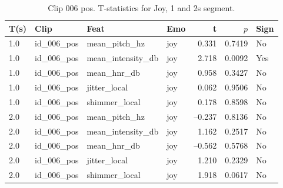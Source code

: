 \begin{table}[h]
  \centering
  \begin{tabular}{l l l l r r l}
    \toprule
    T(s) & Clip           & Feat            & Emo & t & $p$ & Sign \\
    \midrule
    1.0  & id\_006\_pos   & mean\_pitch\_hz       & joy     & 0.331        & 0.7419 & No \\
    1.0  & id\_006\_pos   & mean\_intensity\_db   & joy     & 2.718        & 0.0092 & Yes \\
    1.0  & id\_006\_pos   & mean\_hnr\_db         & joy     & 0.958        & 0.3427 & No \\
    1.0  & id\_006\_pos   & jitter\_local         & joy     & 0.062        & 0.9506 & No \\
    1.0  & id\_006\_pos   & shimmer\_local        & joy     & 0.178        & 0.8598 & No \\
    2.0  & id\_006\_pos   & mean\_pitch\_hz     & joy     & –0.237  & 0.8136 & No \\
    2.0  & id\_006\_pos   & mean\_intensity\_db & joy     &  1.162  & 0.2517 & No \\
    2.0  & id\_006\_pos   & mean\_hnr\_db       & joy     & –0.562  & 0.5768 & No \\
    2.0  & id\_006\_pos   & jitter\_local       & joy     &  1.210  & 0.2329 & No \\
    2.0  & id\_006\_pos   & shimmer\_local      & joy     &  1.918  & 0.0617 & No \\
    \bottomrule
  \end{tabular}
  \caption{Clip 006 pos. T-statistics for Joy, 1 and 2s segment.}
  \label{tab:ttest_joy_1s_006pos}
\end{table}

